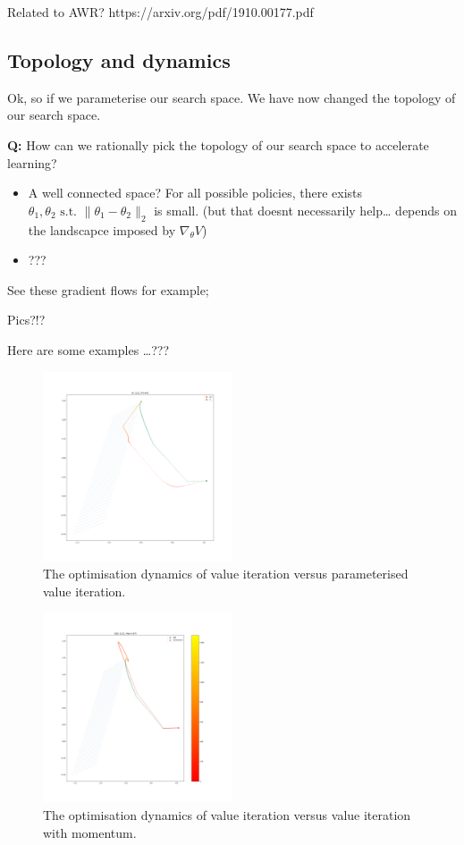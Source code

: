 Related to AWR? https://arxiv.org/pdf/1910.00177.pdf

\subsection{Topology and dynamics}

Ok, so if we parameterise our search space. We have now changed the
topology of our search space.

\textbf{Q:} How can we rationally pick the topology of our search space
to accelerate learning?

\begin{itemize}
\item
  A well connected space? For all possible policies, there exists
  \(\theta_1, \theta_2 \text{ s.t. } \parallel \theta_1- \theta_2\parallel_2\)
  is small. (but that doesnt necessarily help\ldots{} depends on the
  landscapce imposed by \(\nabla_{\theta} V\))
\item
  ???
\end{itemize}

See these gradient flows for example;

Pics?!?

Here are some examples \ldots{}???

\begin{figure}
\centering
\includegraphics[width=0.5\textwidth,height=0.5\textheight]{../../pictures/figures/vi-vs-pvi.png}
\caption{The optimisation dynamics of value iteration versus parameterised value iteration.}
\end{figure}

\begin{figure}
\centering
\includegraphics[width=0.5\textwidth,height=0.5\textheight]{../../pictures/figures/vi_sgd-vs-vi_mom.png}
\caption{The optimisation dynamics of value iteration versus value iteration with momentum.}
\end{figure}

